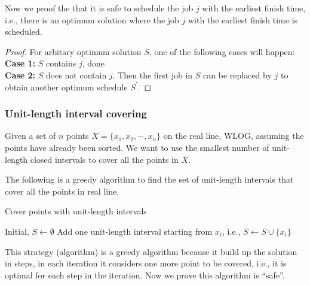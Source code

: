 					Now we proof the that it is safe to schedule the job $j$ with the earliest finish time, i.e., there is an optimum solution where the job $j$ with the earliest finish time is scheduled.

					\begin{proof}
						For arbitary optimum solution $S$, one of the following cases will happen:\\
						\textbf{Case 1: } $S$ contains $j$, done\\
						\textbf{Case 2: } $S$ does not contain $j$. Then the first job in $S$ can be replaced by $j$ to obtain another optimum schedule $S^\prime$.
					\end{proof}

				\subsubsection{Unit-length interval covering}
					Given a set of $n$ points $X = \{x_1, x_2, \cdots, x_n\}$ on the real line, WLOG, assuming the points have already been sorted. We want to use the smallest number of unit-length closed intervals to cover all the points in $X$. 

					The following is a greedy algorithm to find the set of unit-length intervals that cover all the points in real line.
					\begin{algorithm}[!ht]
						\caption{Cover points with unit-length intervals}
						\begin{algorithmic}[1]
							\State Initial, $S \gets \emptyset$
									\State Add one unit-length interval starting from $x_i$, i.e., $S \gets S \cup \{x_i\}$
								\EndIf
							\EndFor
						\end{algorithmic}
					\end{algorithm}

					This strategy (algorithm) is a greedy algorithm because it build up the solution in steps, in each iteration it considers one more point to be covered, i.e., it is optimal for each step in the iteration. Now we prove this algorithm is ``safe''.

